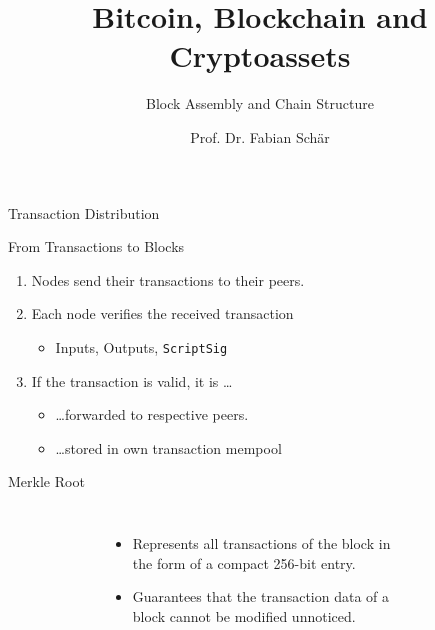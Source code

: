 \documentclass[]{beamer}
\title{Bitcoin, Blockchain and Cryptoassets}
\subtitle{Block Assembly and Chain Structure}
\author{Prof. Dr. Fabian Schär}
\institute{University of Basel}
\begin{document}
\thispagestyle{empty}
\begin{frame}[noframenumbering]
	\titlepage
\end{frame}

\begin{frame}{Transaction Distribution}
\begin{figure}
	\centering
	\begin{tikzpicture}[scale=0.9, every node/.style={scale=0.9}]
		
	\end{tikzpicture}
\end{figure}
\end{frame}


\begin{frame}{From Transactions to Blocks}
	\begin{enumerate}
		\item<1-> Nodes send their transactions to their peers.
		\item<2-> Each node verifies the received transaction
			\begin{itemize}
				\item<2-> Inputs, Outputs, \texttt{ScriptSig}
			\end{itemize}			 
		\item<3-> If the transaction is valid, it is \dots
			\begin{itemize}
				\item<3-> \dots forwarded to respective peers.
				\item<3-> \dots stored in own transaction mempool
			\end{itemize}
	\end{enumerate}	
	\vspace{1em}
\end{frame}

\begin{frame}{Merkle Root}
	\begin{columns}
		\begin{figure}
			
		\end{figure}
		\begin{itemize}
			\item Represents all transactions of the block in the form of a compact 256-bit entry.
			\item Guarantees that the transaction data of a block cannot be modified unnoticed.
		\end{itemize}
		\begin{figure}
			
		\end{figure}
	\end{columns}
\end{frame}
\end{document}
